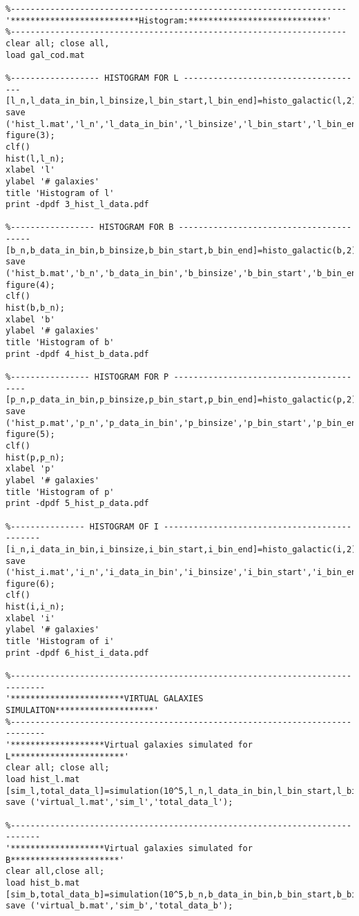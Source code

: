 \begin{verbatim}
%--------------------------------------------------------------------
'**************************Histogram:****************************'
%--------------------------------------------------------------------
clear all; close all, 
load gal_cod.mat

%------------------ HISTOGRAM FOR L -------------------------------------
[l_n,l_data_in_bin,l_binsize,l_bin_start,l_bin_end]=histo_galactic(l,2);
save ('hist_l.mat','l_n','l_data_in_bin','l_binsize','l_bin_start','l_bin_end')
figure(3);
clf()
hist(l,l_n);
xlabel 'l'
ylabel '# galaxies'
title 'Histogram of l'
print -dpdf 3_hist_l_data.pdf

%----------------- HISTOGRAM FOR B ----------------------------------------
[b_n,b_data_in_bin,b_binsize,b_bin_start,b_bin_end]=histo_galactic(b,2);
save ('hist_b.mat','b_n','b_data_in_bin','b_binsize','b_bin_start','b_bin_end')
figure(4);
clf()
hist(b,b_n);
xlabel 'b'
ylabel '# galaxies'
title 'Histogram of b'
print -dpdf 4_hist_b_data.pdf

%---------------- HISTOGRAM FOR P ----------------------------------------
[p_n,p_data_in_bin,p_binsize,p_bin_start,p_bin_end]=histo_galactic(p,2);
save ('hist_p.mat','p_n','p_data_in_bin','p_binsize','p_bin_start','p_bin_end')
figure(5);
clf()
hist(p,p_n);
xlabel 'p'
ylabel '# galaxies'
title 'Histogram of p'
print -dpdf 5_hist_p_data.pdf

%--------------- HISTOGRAM OF I ---------------------------------------------
[i_n,i_data_in_bin,i_binsize,i_bin_start,i_bin_end]=histo_galactic(i,2);
save ('hist_i.mat','i_n','i_data_in_bin','i_binsize','i_bin_start','i_bin_end')
figure(6);
clf()
hist(i,i_n);
xlabel 'i'
ylabel '# galaxies'
title 'Histogram of i'
print -dpdf 6_hist_i_data.pdf

%-----------------------------------------------------------------------------
'***********************VIRTUAL GALAXIES SIMULAITON********************'
%-----------------------------------------------------------------------------
'*******************Virtual galaxies simulated for L***********************'
clear all; close all; 
load hist_l.mat
[sim_l,total_data_l]=simulation(10^5,l_n,l_data_in_bin,l_bin_start,l_binsize);
save ('virtual_l.mat','sim_l','total_data_l');

%----------------------------------------------------------------------------
'*******************Virtual galaxies simulated for B**********************'
clear all,close all;
load hist_b.mat
[sim_b,total_data_b]=simulation(10^5,b_n,b_data_in_bin,b_bin_start,b_binsize);
save ('virtual_b.mat','sim_b','total_data_b');


\end{verbatim}
